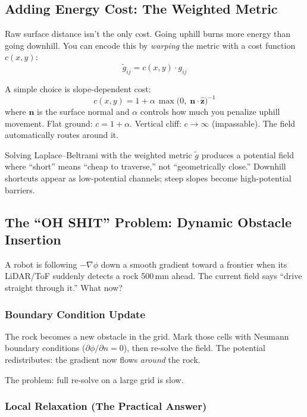 \documentclass[11pt]{article}
\begin{document}
\subsection{Adding Energy Cost: The Weighted Metric}

Raw surface distance isn't the only cost.  Going uphill burns more
energy than going downhill.  You can encode this by \emph{warping}
the metric with a cost function $c(x,y)$:
\begin{equation}
    \tilde{g}_{ij} = c(x,y) \cdot g_{ij}
    \label{eq:weighted_metric}
\end{equation}

A simple choice is slope-dependent cost:
\begin{equation}
    c(x,y) = 1 + \alpha\,\max\!\bigl(0,\;
    \mathbf{n} \cdot \hat{\mathbf{z}}\bigr)^{-1}
\end{equation}
where $\mathbf{n}$ is the surface normal and $\alpha$ controls how
much you penalize uphill movement.  Flat ground: $c = 1 + \alpha$.
Vertical cliff: $c \to \infty$ (impassable).  The field
automatically routes around it.

Solving Laplace--Beltrami with the weighted metric
$\tilde{g}$ produces a potential field where ``short'' means
``cheap to traverse,'' not ``geometrically close.''  Downhill
shortcuts appear as low-potential channels; steep slopes become
high-potential barriers.

\subsection{The ``OH SHIT'' Problem: Dynamic Obstacle Insertion}

A robot is following $-\nabla\phi$ down a smooth gradient toward a
frontier when its LiDAR/ToF suddenly detects a rock 500\,mm ahead.
The current field says ``drive straight through it.''  What now?

\subsubsection{Boundary Condition Update}

The rock becomes a new obstacle in the grid.  Mark those cells with
Neumann boundary conditions ($\partial\phi/\partial n = 0$), then
re-solve the field.  The potential redistributes: the gradient now
flows \emph{around} the rock.

The problem: full re-solve on a large grid is slow.

\subsubsection{Local Relaxation (The Practical Answer)}
\end{document}
